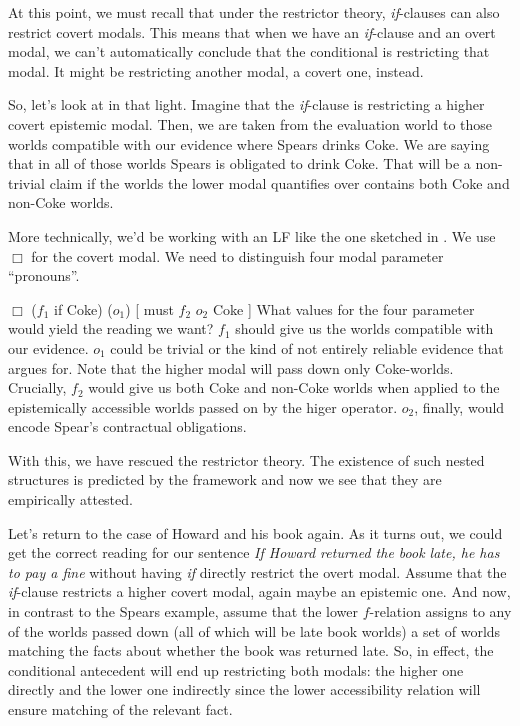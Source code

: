 At this point, we must recall that under the restrictor theory,
\emph{if}-clauses can also restrict covert modals. This means that when we have
an \emph{if}-clause and an overt modal, we can't automatically conclude that the
conditional is restricting that modal. It might be restricting another
modal, a covert one, instead.

So, let's look at \Last in that light. Imagine that the \emph{if}-clause is
restricting a higher covert epistemic modal. Then, we are taken from the
evaluation world to those worlds compatible with our evidence where Spears
drinks Coke. We are saying that in all of those worlds Spears is obligated to
drink Coke. That will be a non-trivial claim if the worlds the lower modal
quantifies over contains both Coke and non-Coke worlds.

More technically, we'd be working with an LF like the one sketched in \Next. We
use $\Box$ for the covert modal. We need to distinguish four modal parameter
``pronouns''.

\ex
$\Box$ ($f_{1}$ if Coke) ($o_{1}$) [ must $f_{2}$ $o_{2}$ Coke ]
\xe
%
What values for the four parameter would yield the reading we want? $f_{1}$
should give us the worlds compatible with our evidence. $o_{1}$ could be trivial
or the kind of not entirely reliable evidence that \cite{kratzer-1991-modality}
argues for. Note that the higher modal will pass down only Coke-worlds.
Crucially, $f_{2}$ would give us both Coke and non-Coke worlds when applied to
the epistemically accessible worlds passed on by the higer operator. $o_{2}$,
finally, would encode Spear's contractual obligations.

With this, we have rescued the restrictor theory. The existence of such nested
structures is predicted by the framework and now we see that they are
empirically attested.  

Let's return to the case of Howard and his book again. As it turns out, we could
get the correct reading for our sentence \emph{If Howard returned the book late,
  he has to pay a fine} without having \emph{if} directly restrict the overt
modal. Assume that the \emph{if}-clause restricts a higher covert modal, again
maybe an epistemic one. And now, in contrast to the Spears example, assume that
the lower $f$-relation assigns to any of the worlds passed down (all of which
will be late book worlds) a set of worlds matching the facts about whether the
book was returned late. So, in effect, the conditional antecedent will end up
restricting both modals: the higher one directly and the lower one indirectly
since the lower accessibility relation will ensure matching of the relevant
fact.

